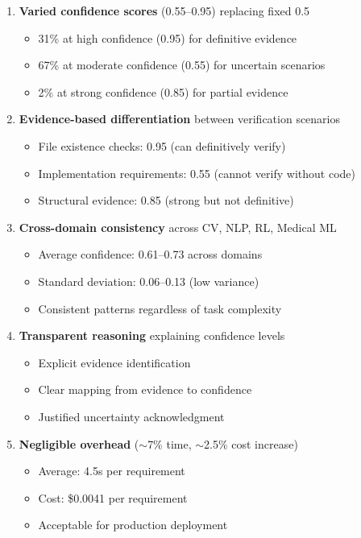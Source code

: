 \documentclass[11pt,a4paper]{article}
\begin{document}
\begin{enumerate}[leftmargin=*]
    \item \textbf{Varied confidence scores} (0.55--0.95) replacing fixed 0.5
    \begin{itemize}
        \item 31\% at high confidence (0.95) for definitive evidence
        \item 67\% at moderate confidence (0.55) for uncertain scenarios
        \item 2\% at strong confidence (0.85) for partial evidence
    \end{itemize}
    
    \item \textbf{Evidence-based differentiation} between verification scenarios
    \begin{itemize}
        \item File existence checks: 0.95 (can definitively verify)
        \item Implementation requirements: 0.55 (cannot verify without code)
        \item Structural evidence: 0.85 (strong but not definitive)
    \end{itemize}
    
    \item \textbf{Cross-domain consistency} across CV, NLP, RL, Medical ML
    \begin{itemize}
        \item Average confidence: 0.61--0.73 across domains
        \item Standard deviation: 0.06--0.13 (low variance)
        \item Consistent patterns regardless of task complexity
    \end{itemize}
    
    \item \textbf{Transparent reasoning} explaining confidence levels
    \begin{itemize}
        \item Explicit evidence identification
        \item Clear mapping from evidence to confidence
        \item Justified uncertainty acknowledgment
    \end{itemize}
    
    \item \textbf{Negligible overhead} ($\sim$7\% time, $\sim$2.5\% cost increase)
    \begin{itemize}
        \item Average: 4.5s per requirement
        \item Cost: \$0.0041 per requirement
        \item Acceptable for production deployment
    \end{itemize}
\end{enumerate}
\end{document}
